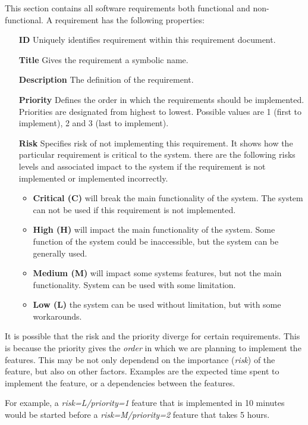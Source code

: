 This section contains all software requirements both functional and non-functional.
A requirement has the following properties:
\begin{itemize}
	\item[\bf{ID}] Uniquely identifies requirement within this requirement document.
	\item[\bf{Title}] Gives the requirement a symbolic name.
	\item[\bf{Description}] The definition of the requirement.
        \item[\bf{Priority}] Defines the order in which the requirements should be implemented. Priorities are designated from highest to lowest. 
	Possible values are 1 (first to implement), 2 and 3 (last to implement).
        \item[\bf{Risk}] Specifies risk of not implementing this requirement. It shows how the particular requirement is critical to the system. 
	there are the following risks levels and associated impact to the system if the requirement is not implemented or implemented incorrectly.
		\begin{itemize}
			\item {\bf Critical (C)}  will break the main functionality of the system. The system can not be used if this requirement is not implemented.
			\item {\bf High (H)} will impact the main functionality of the system. Some function of the system could be inaccessible, but the 
			system can be generally used.
			\item {\bf Medium (M)} will impact some systems features, but not the main functionality. System can be used with some limitation.
			\item {\bf Low (L)} the system can be used without limitation, but with some workarounds.

		\end{itemize}

  \end{itemize}

  It is possible that the risk and the priority diverge for certain requirements. This is because the priority gives the \textit{order} in which we are planning to implement the features. This may be not only dependend on the importance (\textit{risk}) of the feature, but also on other factors. Examples are the expected time spent to implement the feature, or a dependencies between the features.

For example, a \textit{risk=L/priority=1} feature that is implemented in 10 minutes would be started before a \textit{risk=M/priority=2} feature that takes 5 hours.


